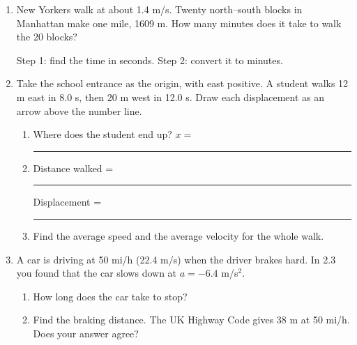 \documentclass[12pt, twoside]{article}
\newcommand{\blank}[1][2.4cm]{\rule{#1}{0.4pt}}
\begin{document}
\begin{enumerate}[itemsep=0.6cm]
\item New Yorkers walk at about 1.4 m/s. Twenty north--south blocks in Manhattan make
  one mile, 1609 m. How many minutes does it take to walk the 20 blocks?

  Step 1: find the time in seconds. \quad Step 2: convert it to minutes.

\newpage

\item Take the school entrance as the origin, with east positive. A student walks
  12 m east in 8.0 s, then 20 m west in 12.0 s. Draw each displacement as an arrow
  above the number line.

  \begin{center}
  \end{center}

  \begin{enumerate}[itemsep=0.6cm]
    \item Where does the student end up? \hfill $x = $ \blank
    \item Distance walked = \blank \hfill Displacement = \blank
    \item Find the average speed and the average velocity for the whole walk.
      \vspace{3.5cm}
  \end{enumerate}

\item A car is driving at 50 mi/h (22.4 m/s) when the driver brakes hard. In 2.3 you
  found that the car slows down at $a = -6.4$ m/s$^2$.
  \begin{enumerate}[itemsep=0.4cm]
    \item How long does the car take to stop?
      \vspace{3.5cm}
    \item Find the braking distance. The UK Highway Code gives 38 m at 50 mi/h. Does
      your answer agree?
  \end{enumerate}


\end{enumerate}
\end{document}
